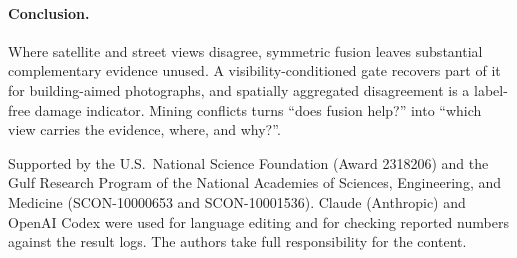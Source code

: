\documentclass[sigconf]{acmart}
\begin{document}
\paragraph{Conclusion.}
Where satellite and street views disagree, symmetric fusion leaves
substantial complementary evidence unused. A visibility-conditioned gate
recovers part of it for building-aimed photographs, and spatially
aggregated disagreement is a label-free damage indicator.
Mining conflicts turns ``does fusion help?'' into ``which view carries the
evidence, where, and why?''.

\begin{acks}
Supported by the U.S.\ National Science Foundation (Award 2318206) and the
Gulf Research Program of the National Academies of Sciences, Engineering,
and Medicine (SCON-10000653 and SCON-10001536).
Claude (Anthropic) and OpenAI Codex were used for language editing and for
checking reported numbers against the result logs. The authors take full
responsibility for the content.
\end{acks}



\end{document}
